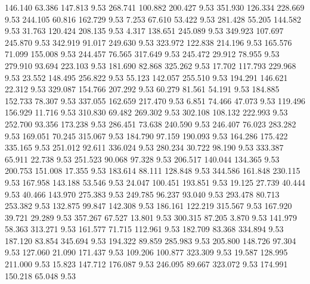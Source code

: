  146.140   63.386  147.813         9.53
 268.741  100.882  200.427         9.53
 351.930  126.334  228.669         9.53
 244.105   60.816  162.729         9.53
   7.253   67.610   53.422         9.53
 281.428   55.205  144.582         9.53
  31.763  120.424  208.135         9.53
   4.317  138.651  245.089         9.53
 349.923  107.697  245.870         9.53
 342.919   91.017  249.630         9.53
 323.972  122.838  214.196         9.53
 165.576   71.099  155.008         9.53
 244.457   76.565  317.649         9.53
 245.472   29.912   78.955         9.53
 279.910   93.694  223.103         9.53
 181.690   82.868  325.262         9.53
  17.702  117.793  229.968         9.53
  23.552  148.495  256.822         9.53
  55.123  142.057  255.510         9.53
 194.291  146.621   22.312         9.53
 329.087  154.766  207.292         9.53
  60.279   81.561   54.191         9.53
 184.885  152.733   78.307         9.53
 337.055  162.659  217.470         9.53
   6.851   74.466   47.073         9.53
 119.496  156.929   11.716         9.53
 310.830   69.482  269.302         9.53
 302.108  108.132  222.993         9.53
 252.700   93.356  173.238         9.53
 286.451   73.638  240.590         9.53
 246.407   76.023  283.282         9.53
 169.051   70.245  315.067         9.53
 184.790   97.159  190.093         9.53
 164.286  175.422  335.165         9.53
 251.012   92.611  336.024         9.53
 280.234   30.722   98.190         9.53
 333.387   65.911   22.738         9.53
 251.523   90.068   97.328         9.53
 206.517  140.044  134.365         9.53
 200.753  151.008   17.355         9.53
 183.614   88.111  128.848         9.53
 344.586  161.848  230.115         9.53
 167.958  143.188   53.546         9.53
  24.047  100.451  193.851         9.53
  19.125   27.739   40.444         9.53
  40.466  143.970  275.383         9.53
 249.785   96.237   93.040         9.53
 293.478   80.713  253.382         9.53
 132.875   99.847  142.308         9.53
 186.161  122.219  315.567         9.53
 167.920   39.721   29.289         9.53
 357.267   67.527   13.801         9.53
 300.315   87.205    3.870         9.53
 141.979   58.363  313.271         9.53
 161.577   71.715  112.961         9.53
 182.709   83.368  334.894         9.53
 187.120   83.854  345.694         9.53
 194.322   89.859  285.983         9.53
 205.800  148.726   97.304         9.53
 127.060   21.090  171.437         9.53
 109.206  100.877  323.309         9.53
  19.587  128.995  211.000         9.53
  15.823  147.712  176.087         9.53
 246.095   89.667  323.072         9.53
 174.991  150.218   65.048         9.53
